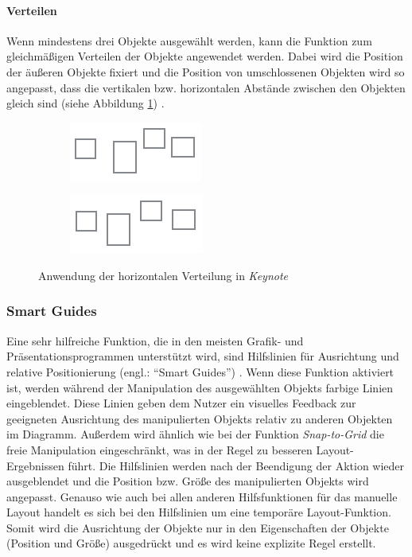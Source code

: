 \paragraph{Verteilen}

Wenn mindestens drei Objekte ausgewählt werden, kann die Funktion zum gleichmäßigen Verteilen der Objekte angewendet werden. Dabei wird die Position der äußeren Objekte fixiert und die Position von umschlossenen Objekten wird so angepasst, dass die vertikalen bzw. horizontalen Abstände zwischen den Objekten gleich sind (siehe Abbildung \ref{fig:keynote-horizontal-distribution}) \cite{11Keynote}.

\begin{figure}[hbt]
    \newcommand{\subfigurewidth}{0.5\textwidth}
    \begin{subfigure}{\subfigurewidth}
        \centering
        \includegraphics{assets/keynote-horizontal-distribution-a}
        \caption{}
    \end{subfigure}
    \begin{subfigure}{\subfigurewidth}
        \centering
        \includegraphics{assets/keynote-horizontal-distribution-b}
        \caption{}
    \end{subfigure}
    \caption{Anwendung der horizontalen Verteilung in \textit{Keynote}}
    \label{fig:keynote-horizontal-distribution}
\end{figure}

\subsubsection{Smart Guides}
\label{subsubsec:smart-guides}

Eine sehr hilfreiche Funktion, die in den meisten Grafik- und Präsentationsprogrammen unterstützt wird, sind Hilfslinien für Ausrichtung und relative Positionierung (engl.: \enquote{Smart Guides}) \cite{11Keynote}. Wenn diese Funktion aktiviert ist, werden während der Manipulation des ausgewählten Objekts farbige Linien eingeblendet. Diese Linien geben dem Nutzer ein visuelles Feedback zur geeigneten Ausrichtung des manipulierten Objekts relativ zu anderen Objekten im Diagramm. Außerdem wird ähnlich wie bei der Funktion \textit{Snap-to-Grid} die freie Manipulation eingeschränkt, was in der Regel zu besseren Layout-Ergebnissen führt. Die Hilfslinien werden nach der Beendigung der Aktion wieder ausgeblendet und die Position bzw. Größe des manipulierten Objekts wird angepasst. Genauso wie auch bei allen anderen Hilfsfunktionen für das manuelle Layout handelt es sich bei den Hilfslinien um eine temporäre Layout-Funktion. Somit wird die Ausrichtung der Objekte nur in den Eigenschaften der Objekte (Position und Größe) ausgedrückt und es wird keine explizite Regel erstellt.

